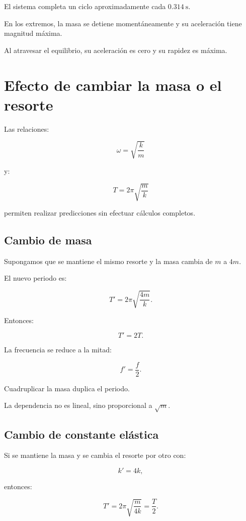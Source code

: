 \begin{interpretacion}
El sistema completa un ciclo aproximadamente cada \(\SI{0.314}{\second}\).

En los extremos, la masa se detiene momentáneamente y su aceleración tiene magnitud máxima.

Al atravesar el equilibrio, su aceleración es cero y su rapidez es máxima.
\end{interpretacion}


\section{Efecto de cambiar la masa o el resorte}

Las relaciones:

\[ \omega=\sqrt{\frac{k}{m}} \]

y:

\[ T=2\pi\sqrt{\frac{m}{k}} \]

permiten realizar predicciones sin efectuar cálculos completos.


\subsection{Cambio de masa}

Supongamos que se mantiene el mismo resorte y la masa cambia de \(m\) a \(4m\).

El nuevo periodo es:

\[
T'
=
2\pi\sqrt{\frac{4m}{k}}.
\]

Entonces:

\[ T'=2T. \]

La frecuencia se reduce a la mitad:

\[ f'=\frac{f}{2}. \]

\begin{interpretacion}
Cuadruplicar la masa duplica el periodo.

La dependencia no es lineal, sino proporcional a \(\sqrt{m}\).
\end{interpretacion}


\subsection{Cambio de constante elástica}

Si se mantiene la masa y se cambia el resorte por otro con:

\[ k'=4k, \]

entonces:

\[
T'
=
2\pi\sqrt{\frac{m}{4k}}
=
\frac{T}{2}.
\]

